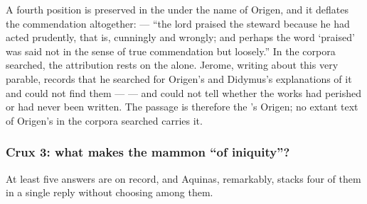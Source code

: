 A fourth position is preserved in the  under the name of
Origen, and it deflates the commendation altogether:  ---
``the lord praised the steward because he had acted prudently, that is,
cunningly and wrongly; and perhaps the word `praised' was said not in the sense
of true commendation but loosely.'' In the corpora searched, the attribution
rests on the  alone. Jerome, writing
about this very parable, records that he searched for Origen's and Didymus's
explanations of it and could not find them ---  --- and could not tell whether
the works had perished or had never been written. The passage is therefore the
's Origen; no extant text of Origen's in the corpora searched
carries it.

\subsubsection*{Crux 3: what makes the mammon ``of iniquity''?}

At least five answers are on record, and Aquinas, remarkably, stacks four of
them in a single reply without choosing among them.

